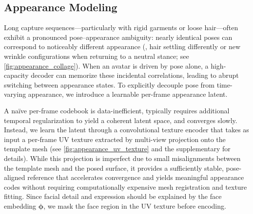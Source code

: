 \documentclass[runningheads]{llncs}
\newcommand{\vect}[1]{\boldsymbol{\mathbf{#1}}}
\begin{document}



\subsection{Appearance Modeling}
\label{subsec:method_app_modeling}

Long capture sequences---particularly with rigid garments or loose hair---often exhibit a pronounced pose--appearance ambiguity: nearly identical poses can correspond to noticeably different appearance (\eg, hair settling differently or new wrinkle configurations when returning to a neutral stance; see \cref{fig:appearance_collage}).
When an avatar is driven by pose alone, a high-capacity decoder can memorize these incidental correlations, leading to abrupt switching between appearance states.
To explicitly decouple pose from time-varying appearance, we introduce a learnable per-frame appearance latent.

A naïve per-frame codebook is data-inefficient, typically requires additional temporal regularization to yield a coherent latent space, and converges slowly.
Instead, we learn the latent through a convolutional texture encoder that takes as input a per-frame UV texture extracted by multi-view projection onto the template mesh (see \cref{fig:appearance_uv_texture} and the supplementary for details).
While this projection is imperfect due to small misalignments between the template mesh and the posed surface, it provides a sufficiently stable, pose-aligned reference that accelerates convergence and yields meaningful appearance codes without requiring computationally expensive mesh registration and texture fitting.
Since facial detail and expression should be explained by the face embedding $\vect{\phi}$, we mask the face region in the UV texture before encoding.
\end{document}
